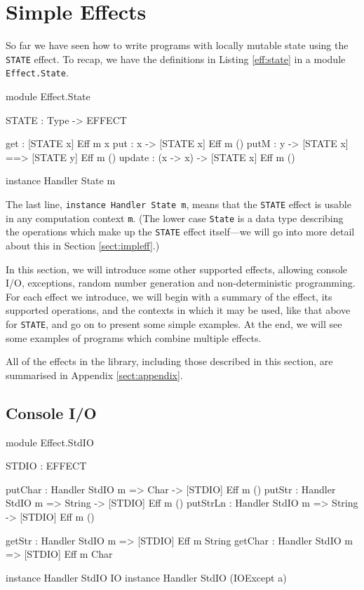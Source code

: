 \section{Simple Effects}

\label{sect:simpleff}

So far we have seen how to write programs with locally mutable state using the
\texttt{STATE} effect. To recap, we have the definitions in
Listing \ref{eff:state} in a module \texttt{Effect.State}.

\begin{code}[float=h,frame=single,caption={State Effect},label=eff:state]
module Effect.State

STATE : Type -> EFFECT

get    :             { [STATE x] } Eff m x
put    : x ->        { [STATE x] } Eff m () 
putM   : y ->        { [STATE x] ==> [STATE y] } Eff m () 
update : (x -> x) -> { [STATE x] } Eff m () 

instance Handler State m
\end{code}

\noindent
The last line, \texttt{instance Handler State m}, means that the \texttt{STATE}
effect is usable in any computation context \texttt{m}. (The lower case
\texttt{State} is a data type describing the operations which make up the
\texttt{STATE} effect itself---we will go into more
detail about this in Section \ref{sect:impleff}.) 

In this section, we will introduce some other supported effects, allowing
console I/O, exceptions, random number generation and non-deterministic
programming.
For each effect we introduce, we will begin with a summary of the effect,
its supported operations, and the contexts in which it may be used,
like that above for \texttt{STATE}, and go on to
present some simple examples. At the end, we will see some examples of programs
which combine multiple effects.

All of the effects in the library, including those described in this section,
are summarised in Appendix \ref{sect:appendix}.

\subsection{Console I/O}

\begin{code}[float=h,frame=single, caption={Console I/O Effect}, label=eff:stdio]
module Effect.StdIO

STDIO : EFFECT

putChar  : Handler StdIO m => Char ->   { [STDIO] } Eff m ()
putStr   : Handler StdIO m => String -> { [STDIO] } Eff m ()
putStrLn : Handler StdIO m => String -> { [STDIO] } Eff m ()

getStr   : Handler StdIO m =>           { [STDIO] } Eff m String
getChar  : Handler StdIO m =>           { [STDIO] } Eff m Char

instance Handler StdIO IO
instance Handler StdIO (IOExcept a)
\end{code}

